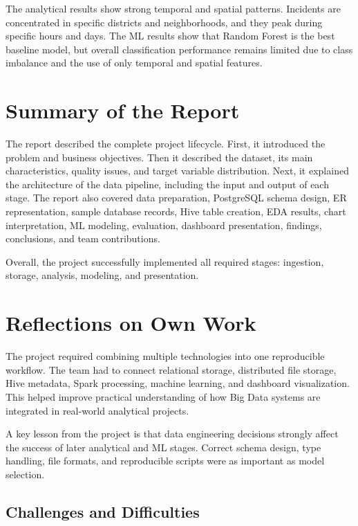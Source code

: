 \documentclass[12pt,a4paper]{article}
\begin{document}
The analytical results show strong temporal and spatial patterns. Incidents are concentrated in specific districts and neighborhoods, and they peak during specific hours and days. The ML results show that Random Forest is the best baseline model, but overall classification performance remains limited due to class imbalance and the use of only temporal and spatial features.

\section{Summary of the Report}

The report described the complete project lifecycle. First, it introduced the problem and business objectives. Then it described the dataset, its main characteristics, quality issues, and target variable distribution. Next, it explained the architecture of the data pipeline, including the input and output of each stage. The report also covered data preparation, PostgreSQL schema design, ER representation, sample database records, Hive table creation, EDA results, chart interpretation, ML modeling, evaluation, dashboard presentation, findings, conclusions, and team contributions.

Overall, the project successfully implemented all required stages: ingestion, storage, analysis, modeling, and presentation.

\section{Reflections on Own Work}

The project required combining multiple technologies into one reproducible workflow. The team had to connect relational storage, distributed file storage, Hive metadata, Spark processing, machine learning, and dashboard visualization. This helped improve practical understanding of how Big Data systems are integrated in real-world analytical projects.

A key lesson from the project is that data engineering decisions strongly affect the success of later analytical and ML stages. Correct schema design, type handling, file formats, and reproducible scripts were as important as model selection.

\subsection{Challenges and Difficulties}
\end{document}
